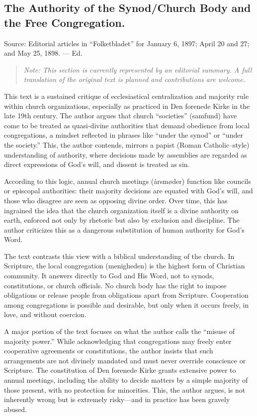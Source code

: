 
\subsection{The Authority of the Synod/Church Body and the Free Congregation.}

Source: Editorial articles in “Folketbladet” for January 6, 1897; April 20 and 27; and May 25, 1898. — Ed.


\begin{quote}
\emph{Note: This section is currently represented by an editorial summary. 
A full translation of the original text is planned and contributions are welcome.}
\end{quote}

This text is a sustained critique of ecclesiastical centralization and majority rule within church organizations, especially as practiced in Den forenede Kirke in the late 19th century. The author argues that church “societies” (samfund) have come to be treated as quasi-divine authorities that demand obedience from local congregations, a mindset reflected in phrases like “under the synod” or “under the society.” This, the author contends, mirrors a papist (Roman Catholic–style) understanding of authority, where decisions made by assemblies are regarded as direct expressions of God’s will, and dissent is treated as sin.

According to this logic, annual church meetings (årsmøder) function like councils or episcopal authorities: their majority decisions are equated with God’s will, and those who disagree are seen as opposing divine order. Over time, this has ingrained the idea that the church organization itself is a divine authority on earth, enforced not only by rhetoric but also by exclusion and discipline. The author criticizes this as a dangerous substitution of human authority for God’s Word.

The text contrasts this view with a biblical understanding of the church. In Scripture, the local congregation (menigheden) is the highest form of Christian community. It answers directly to God and His Word, not to synods, constitutions, or church officials. No church body has the right to impose obligations or release people from obligations apart from Scripture. Cooperation among congregations is possible and desirable, but only when it occurs freely, in love, and without coercion.

A major portion of the text focuses on what the author calls the “misuse of majority power.” While acknowledging that congregations may freely enter cooperative agreements or constitutions, the author insists that such arrangements are not divinely mandated and must never override conscience or Scripture. The constitution of Den forenede Kirke grants extensive power to annual meetings, including the ability to decide matters by a simple majority of those present, with no protection for minorities. This, the author argues, is not inherently wrong but is extremely risky—and in practice has been gravely abused.

